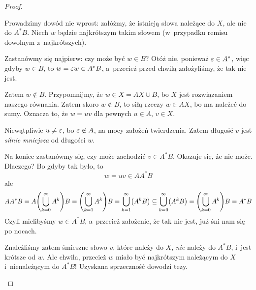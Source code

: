 \begin{proof}
\begin{enumerate}[label={(\roman*)}]
            Prowadzimy dowód nie wprost: załóżmy, że istnieją słowa należące do \(X\), ale nie do \(A^*B\). Niech \(w\) będzie najkrótszym takim słowem (w~przypadku remisu dowolnym z~najkrótszych).
            
            Zastanówmy się najpierw: czy może być \(w \in B\)? Otóż nie, ponieważ \(\varepsilon \in A^*\), więc gdyby \(w \in B\), to \(w = \varepsilon w \in A^*B\), a~przecież przed chwilą założyliśmy, że tak nie jest.
            
            Zatem \(w \not\in B\). Przypomnijmy, że \(w \in X = AX \cup B\), bo \(X\) jest rozwiązaniem naszego równania. Zatem skoro \(w \not\in B\), to siłą rzeczy \(w \in AX\), bo ma należeć do sumy. Oznacza to, że \(w = uv\) dla pewnych \(u \in A\), \(v \in X\).
            
            Niewątpliwie \(u \neq \varepsilon\), bo \(\varepsilon \not\in A\), na mocy założeń twierdzenia. Zatem długość \(v\) jest \emph{silnie mniejsza} od długości \(w\).
            
            Na koniec zastanówmy się, czy może zachodzić \(v \in A^*B\). Okazuje się, że nie może. Dlaczego? Bo gdyby tak było, to
            \begin{equation*}
                w = uv \in AA^*B
            \end{equation*}
            ale
            \begin{equation*}
                AA^*B
                    = A\pars{\bigcup_{k = 0}^{\infty}A^k}B
                    = \pars{\bigcup_{k = 1}^{\infty}A^k}B
                    = \bigcup_{k = 1}^{\infty}\pars{A^kB}
                    \subseteq \bigcup_{k = 0}^{\infty}\pars{A^kB}
                    = \pars{\bigcup_{k = 0}^{\infty}A^k}B
                    = A^*B
            \end{equation*}
            Czyli mielibyśmy \(w \in A^*B\), a~przecież założenie, że tak nie jest, już śni nam się po nocach.
            
            Znaleźliśmy zatem śmieszne słowo \(v\), które należy do \(X\), \emph{nie} należy do \(A^*B\), i~jest krótsze od \(w\). Ale chwila, przecież \(w\) miało być najkrótszym należącym do \(X\) i~nienależącym do \(A^*B\)! Uzyskana sprzeczność dowodzi tezy.
    \end{enumerate}
\end{proof}


